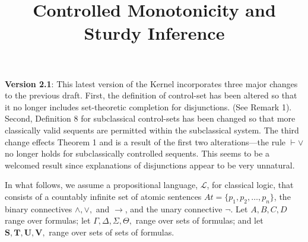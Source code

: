 \documentclass{article}                     %
\theoremstyle{theorem}
\theoremstyle{corollary}
\theoremstyle{lemma}
\theoremstyle{definition}
\theoremstyle{remark}
\theoremstyle{definition}
\theoremstyle{notation}
\theoremstyle{definition}
\theoremstyle{proposition}
\theoremstyle{definition}
\begin{document}
\sloppy
\title{Controlled Monotonicity and Sturdy Inference
}


\raggedbottom

\maketitle

\begin{framed}
\textbf{Version 2.1}: This latest version of the Kernel incorporates three major changes to the previous draft. First, the definition of control-set has been altered so that it no longer includes set-theoretic completion for disjunctions. (See Remark 1). Second, Definition 8 for subclassical control-sets has been changed so that more classically valid sequents are permitted within the subclassical system. The third change effects Theorem 1 and is a result of the first two alterations---the rule $ \vdash\vee $ no longer holds for subclassically controlled sequents. This seems to be a welcomed result since explanations of disjunctions appear to be very unnatural. 
\end{framed}


In what follows, we assume a propositional language, $ \mathcal{L} $, for classical logic, that consists of a countably infinite set of atomic sentences $At = \{p_1, p_2, \ldots,p_n\}$, the binary connectives $\wedge, \vee,$ and $ \to $, and the unary connective $\neg$. Let $A, B, C, D $ range over formulas; let $ \Gamma, \Delta, \Sigma, \Theta, $ range over sets of formulas; and let $ \mathbf{S, T, U ,V,}$ range over sets of sets of formulas. 
\end{document}
